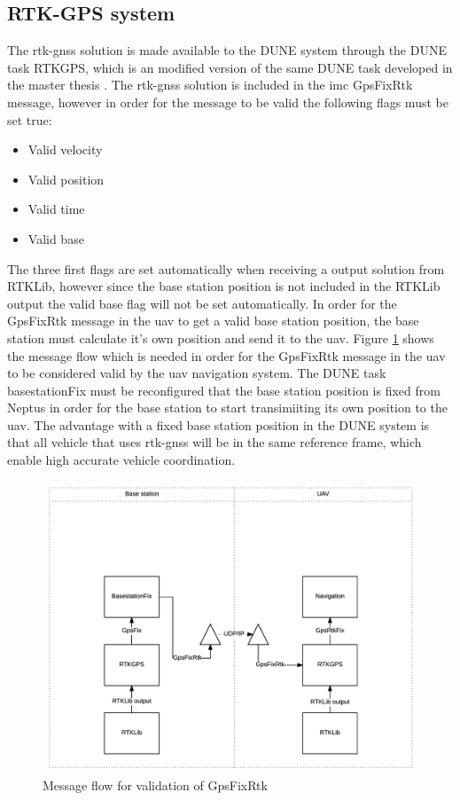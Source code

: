 \subsection{RTK-GPS system}\label{ss:RTK-GPS system}
The \gls{rtk-gnss} solution is made available to the DUNE system through the DUNE task RTKGPS, which is an modified version of the same DUNE task developed in the master thesis \citep{Spockeli}. The \gls{rtk-gnss} solution is included in the \gls{imc} GpsFixRtk message, however in order for the message to be valid the following flags must be set true:
\begin{table}[H]
\begin{itemize}[noitemsep]
\item Valid velocity
\item Valid position
\item Valid time
\item Valid base
\end{itemize}
\end{table}
The three first flags are set automatically when receiving a output solution from RTKLib, however since the base station position is not included in the RTKLib output the valid base flag will not be set automatically. In order for the GpsFixRtk message in the \gls{uav} to get a valid base station position, the base station must calculate it's own position and send it to the \gls{uav}. Figure \ref{Fig:ValidationGpsFixRtk} shows the message flow which is needed in order for the GpsFixRtk message in the \gls{uav} to be considered valid by the \gls{uav} navigation system. The DUNE task basestationFix must be reconfigured that the base station position is fixed from Neptus in order for the base station to start transimiiting its own position to the \gls{uav}. The advantage with a fixed base station position in the DUNE system is that all vehicle that uses \gls{rtk-gnss} will be in the same reference frame, which enable high accurate vehicle coordination.
\begin{figure}[H]
\centering
\includegraphics[scale=0.7]{figs/ValidationGpsFixRtk.png}
\caption{Message flow for validation of GpsFixRtk}
\label{Fig:ValidationGpsFixRtk}
\end{figure}
